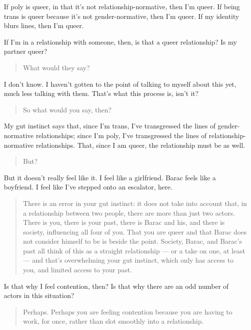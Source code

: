 If poly is queer, in that it's not relationship-normative, then I'm queer. If being trans is queer because it's not gender-normative, then I'm queer. If my identity blurs lines, then I'm queer.

If I'm in a relationship with someone, then, is that a queer relationship? Is my partner queer?

\begin{quote}
What would they say?
\end{quote}

I don't know. I haven't gotten to the point of talking to myself about this yet, much less talking with them. That's what this process is, isn't it?

\begin{quote}
So what would you say, then?
\end{quote}

My gut instinct says that, since I'm trans, I've transgressed the lines of gender-normative relationships; since I'm poly, I've transgressed the lines of relationship-normative relationships. That, since I am queer, the relationship must be as well.

\begin{quote}
But?
\end{quote}

But it doesn't really feel like it. I feel like a girlfriend. Barac feels like a boyfriend. I feel like I've stepped onto an escalator, here.

\begin{quote}
There is an error in your gut instinct: it does not take into account that, in a relationship between two people, there are more than just two actors. There is you, there is your past, there is Barac and his, and there is society, influencing all four of you. That you are queer and that Barac does not consider himself to be is beside the point. Society, Barac, and Barac's past all think of this as a straight relationship --- or a take on one, at least --- and that's overwhelming your gut instinct, which only has access to you, and limited access to your past.
\end{quote}

Is that why I feel contention, then? Is that why there are an odd number of actors in this situation?

\begin{quote}
Perhaps. Perhaps you are feeling contention because you are having to work, for once, rather than slot smoothly into a relationship.
\end{quote}

